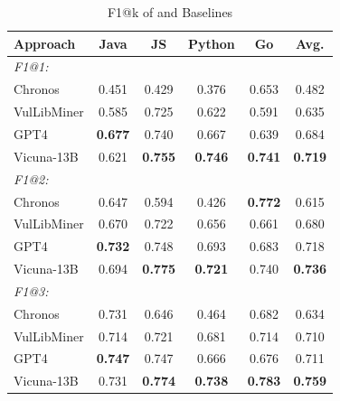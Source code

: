 \begin{table}[t]
\centering
\caption{F1@k of \detector{} and Baselines}
\label{tab: baseline cmp: F1}
\small
\begin{threeparttable}
\begin{tabular}{lccccc}
\toprule
Approach     & Java    & JS     & Python & Go  & Avg.   \\
\midrule
\multicolumn{5}{l}{\textit{F1@1:}}               \\
Chronos     & 0.451    & 0.429 & 0.376  & 0.653 & 0.482   \\
VulLibMiner & 0.585    & 0.725 & 0.622  & 0.591 & 0.635   \\
GPT4        & \textbf{0.677}    & 0.740 & 0.667  & 0.639 & 0.684   \\
Vicuna-13B  & 0.621    & \textbf{0.755} & \textbf{0.746}  & \textbf{0.741} & \textbf{0.719}   \\
\midrule
\multicolumn{5}{l}{\textit{F1@2:}} &              \\
Chronos     & 0.647    & 0.594 & 0.426  & \textbf{0.772} & 0.615   \\
VulLibMiner & 0.670    & 0.722 & 0.656  & 0.661 & 0.680   \\
GPT4        & \textbf{0.732}    & 0.748 & 0.693  & 0.683 & 0.718   \\
Vicuna-13B  & 0.694    & \textbf{0.775} & \textbf{0.721}  & 0.740 & \textbf{0.736}   \\
\midrule
\multicolumn{5}{l}{\textit{F1@3:}} &   \\
Chronos     & 0.731    & 0.646 & 0.464  & 0.682 & 0.634   \\
VulLibMiner & 0.714    & 0.721 & 0.681  & 0.714 & 0.710   \\
GPT4        & \textbf{0.747}    & 0.747 & 0.666  & 0.676 & 0.711   \\
Vicuna-13B  & 0.731    & \textbf{0.774} & \textbf{0.738}  & \textbf{0.783} & \textbf{0.759}   \\
\bottomrule
\end{tabular}
\end{threeparttable}
\end{table}




